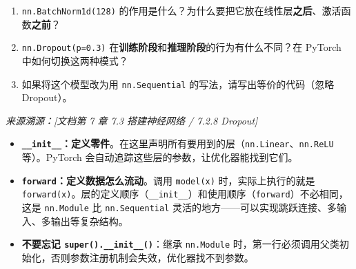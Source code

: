 \documentclass[a4paper,11pt]{ctexart}
\begin{document}
\begin{problembox}
\begin{enumerate}[(1)]
        \item \texttt{nn.BatchNorm1d(128)} 的作用是什么？为什么要把它放在线性层\textbf{之后}、激活函数\textbf{之前}？

        \item \texttt{nn.Dropout(p=0.3)} 在\textbf{训练阶段}和\textbf{推理阶段}的行为有什么不同？在 PyTorch 中如何切换这两种模式？

        \item 如果将这个模型改为用 \texttt{nn.Sequential} 的写法，请写出等价的代码（忽略 Dropout）。
    \end{enumerate}

    \vspace{0.2cm}
    {\color{gray}\small\textit{来源溯源：[文档第 7 章 7.3 搭建神经网络 / 7.2.8 Dropout]}}
\end{problembox}

\begin{beginnerbox}
    \begin{itemize}
        \item \textbf{\texttt{\_\_init\_\_}：定义零件}。在这里声明所有要用到的层（\texttt{nn.Linear}、\texttt{nn.ReLU} 等）。PyTorch 会自动追踪这些层的参数，让优化器能找到它们。
        \item \textbf{\texttt{forward}：定义数据怎么流动}。调用 \texttt{model(x)} 时，实际上执行的就是 \texttt{forward(x)}。层的定义顺序（\texttt{\_\_init\_\_}）和使用顺序（\texttt{forward}）不必相同，这是 \texttt{nn.Module} 比 \texttt{nn.Sequential} 灵活的地方——可以实现跳跃连接、多输入、多输出等复杂结构。
        \item \textbf{不要忘记 \texttt{super().\_\_init\_\_()}}：继承 \texttt{nn.Module} 时，第一行必须调用父类初始化，否则参数注册机制会失效，优化器找不到参数。
    \end{itemize}
\end{beginnerbox}
\end{document}
